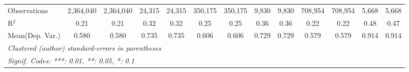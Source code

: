 \begin{tabular}{lcccccccccccc}
   Observations                             & 2,364,040     & 2,364,040      & 24,315        & 24,315         & 350,175       & 350,175         & 9,830        & 9,830    & 708,954       & 708,954        & 5,668         & 5,668\\  
   R$^2$                                    & 0.21          & 0.21           & 0.32          & 0.32           & 0.25          & 0.25            & 0.36         & 0.36     & 0.22          & 0.22           & 0.48          & 0.47\\  
Mean(Dep. Var.) & 0.580 & 0.580 & 0.735 & 0.735 & 0.606 & 0.606 & 0.729 & 0.729 & 0.579 & 0.579 & 0.914 & 0.914 \\
   \midrule \midrule
   \multicolumn{13}{l}{\emph{Clustered (author) standard-errors in parentheses}}\\
   \multicolumn{13}{l}{\emph{Signif. Codes: ***: 0.01, **: 0.05, *: 0.1}}\\
\end{tabular}
\par\endgroup
